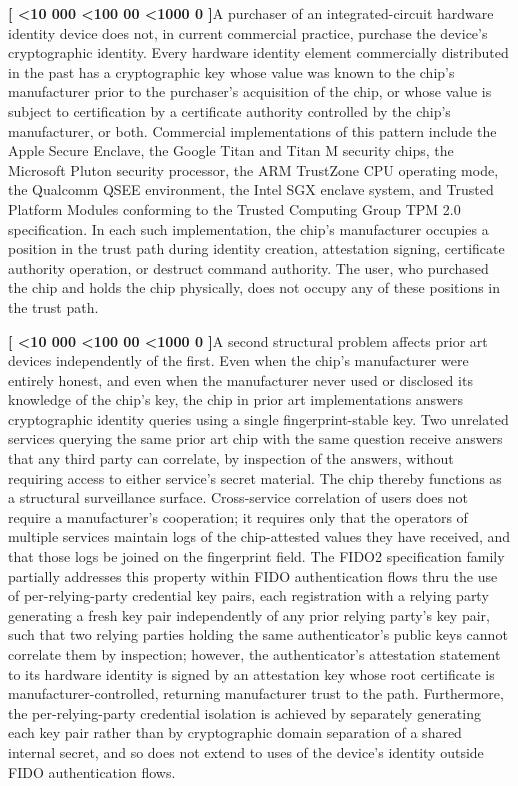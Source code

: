 \documentclass[12pt,letterpaper]{article}
\newcounter{para}
\newcommand{\padzero}{%
  \ifnum\value{para}<10 000\else%
  \ifnum\value{para}<100 00\else%
  \ifnum\value{para}<1000 0\else%
  \fi\fi\fi}
\newcommand{\para}{%
  \refstepcounter{para}\noindent\textbf{[\padzero\arabic{para}]}\hspace{0.5em}\ignorespaces}
\begin{document}
\para A purchaser of an integrated-circuit hardware identity device does not, in current commercial practice, purchase the device's cryptographic identity. Every hardware identity element commercially distributed in the past has a cryptographic key whose value was known to the chip's manufacturer prior to the purchaser's acquisition of the chip, or whose value is subject to certification by a certificate authority controlled by the chip's manufacturer, or both. Commercial implementations of this pattern include the Apple Secure Enclave, the Google Titan and Titan M security chips, the Microsoft Pluton security processor, the ARM TrustZone CPU operating mode, the Qualcomm QSEE environment, the Intel SGX enclave system, and Trusted Platform Modules conforming to the Trusted Computing Group TPM 2.0 specification. In each such implementation, the chip's manufacturer occupies a position in the trust path during identity creation, attestation signing, certificate authority operation, or destruct command authority. The user, who purchased the chip and holds the chip physically, does not occupy any of these positions in the trust path.

\para A second structural problem affects prior art devices independently of the first. Even when the chip's manufacturer were entirely honest, and even when the manufacturer never used or disclosed its knowledge of the chip's key, the chip in prior art implementations answers cryptographic identity queries using a single fingerprint-stable key. Two unrelated services querying the same prior art chip with the same question receive answers that any third party can correlate, by inspection of the answers, without requiring access to either service's secret material. The chip thereby functions as a structural surveillance surface. Cross-service correlation of users does not require a manufacturer's cooperation; it requires only that the operators of multiple services maintain logs of the chip-attested values they have received, and that those logs be joined on the fingerprint field. The FIDO2 specification family partially addresses this property within FIDO authentication flows thru the use of per-relying-party credential key pairs, each registration with a relying party generating a fresh key pair independently of any prior relying party's key pair, such that two relying parties holding the same authenticator's public keys cannot correlate them by inspection; however, the authenticator's attestation statement to its hardware identity is signed by an attestation key whose root certificate is manufacturer-controlled, returning manufacturer trust to the path. Furthermore, the per-relying-party credential isolation is achieved by separately generating each key pair rather than by cryptographic domain separation of a shared internal secret, and so does not extend to uses of the device's identity outside FIDO authentication flows.
\end{document}

